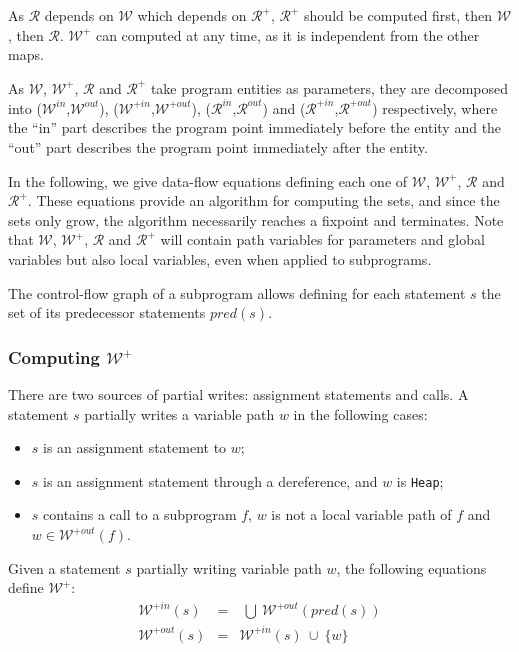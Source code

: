\documentclass{article}
\newcommand{\code}[1]{\texttt{#1}}
\newcommand{\heap}{\code{Heap}\xspace}
\newcommand{\pred}[1]{\ensuremath{\mathit{pred}(#1)}\xspace}
\newcommand{\allwrites}{$\mathcal{W^+}$\xspace}
\newcommand{\Outallwrites}{\ensuremath{\mathcal{W}^{+out}}\xspace}
\newcommand{\Inallwrites}{\ensuremath{\mathcal{W}^{+in}}\xspace}
\newcommand{\inallwrites}[1]{\ensuremath{\mathcal{W}^{+in}(#1)}\xspace}
\newcommand{\outallwrites}[1]{\ensuremath{\mathcal{W}^{+out}(#1)}\xspace}
\newcommand{\writes}{$\mathcal{W}$\xspace}
\newcommand{\Outwrites}{\ensuremath{\mathcal{W}^{out}}\xspace}
\newcommand{\Inwrites}{\ensuremath{\mathcal{W}^{in}}\xspace}
\newcommand{\allreads}{$\mathcal{R^+}$\xspace}
\newcommand{\Outallreads}{\ensuremath{\mathcal{R}^{+out}}\xspace}
\newcommand{\Inallreads}{\ensuremath{\mathcal{R}^{+in}}\xspace}
\newcommand{\reads}{$\mathcal{R}$\xspace}
\newcommand{\Inreads}{\ensuremath{\mathcal{R}^{in}}\xspace}
\newcommand{\Outreads}{\ensuremath{\mathcal{R}^{out}}\xspace}
\newcommand{\union}{~\cup~}
\newcommand{\bigunion}{~\bigcup~}
\begin{document}
As \reads depends on \writes which depends on \allreads, \allreads should be
computed first, then \writes, then \reads. \allwrites can computed at any time, as it is independent from the other maps.

As \writes, \allwrites, \reads and
\allreads take program entities as parameters, they are decomposed into
(\Inwrites,\Outwrites), (\Inallwrites,\Outallwrites), (\Inreads,\Outreads) and
(\Inallreads,\Outallreads) respectively, where the ``in'' part describes the
program point immediately before the entity and the ``out'' part describes the
program point immediately after the entity.

In the following, we give data-flow equations defining each one of \writes,
\allwrites, \reads and \allreads. These equations provide an algorithm for
computing the sets, and since the sets only grow, the algorithm necessarily
reaches a fixpoint and terminates. Note that \writes, \allwrites, \reads and
\allreads will contain path variables for parameters and global variables but
also local variables, even when applied to subprograms.

The control-flow graph of a subprogram allows defining for each statement $s$
the set of its predecessor statements \pred{s}.

\subsubsection{Computing \allwrites}

There are two sources of partial writes: assignment statements and calls. A
statement $s$ partially writes a variable path $w$ in the following cases:
\begin{itemize}
\item $s$ is an assignment statement to $w$;
\item $s$ is an assignment statement through a dereference, and $w$ is \heap;
\item $s$ contains a call to a subprogram $f$, $w$ is not a local variable path
  of $f$ and $w \in \outallwrites{f}$.
\end{itemize}

Given a statement $s$ partially writing variable path $w$, the following
equations define \allwrites:
\begin{eqnarray*}
\inallwrites{s} &=& \bigunion \outallwrites{\pred{s}}\\
\outallwrites{s} &=& \inallwrites{s} \union \{w\}
\end{eqnarray*}
\end{document}
